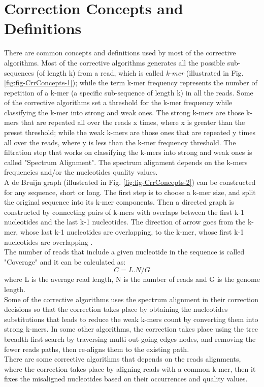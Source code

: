 \documentclass[12pt]{llncs}
\begin{document}
\section{Correction Concepts and Definitions}
There are common concepts and definitions used by most of the corrective algorithms. Most of the corrective algorithms generates all the possible sub-sequences (of length k) from a read, which is called \textit{k-mer} (illustrated in Fig. \ref{fig:fig-CrrConcepts-1}); while the term k-mer frequency represents the number of repetition of a k-mer (a specific sub-sequence of length k) in all the reads. Some of the corrective algorithms set a threshold for the k-mer frequency while classifying the k-mer into strong and weak ones. The strong k-mers are those k-mers that are repeated all over the reads x times, where x is greater than the preset threshold; while the weak k-mers are those ones that are repeated y times all over the reads, where y is less than the k-mer frequency threshold. The filtration step that works on classifying the k-mers into strong and weak ones is called "Spectrum Alignment". The spectrum alignment depends on the k-mers frequencies and/or the nucleotides quality values.
\\
A de Bruijn graph (illustrated in Fig. \ref{fig:fig-CrrConcepts-2}) can be constructed for any sequence, short or long. The first step is to choose a k-mer size, and split the original sequence into its k-mer components. Then a directed graph is constructed by connecting pairs of k-mers with overlaps between the first k-1 nucleotides and the last k-1 nucleotides. The direction of arrow goes from the k-mer, whose last k-1 nucleotides are overlapping, to the k-mer, whose first k-1 nucleotides are overlapping \cite{deBruijn}.
\\ 
The number of reads that include a given nucleotide in the sequence is called "Coverage" and it can be calculated as:
\[ C = L.N/G \]
where L is the average read length, N is the number of reads and G is the genome length.
\\
Some of the corrective algorithms uses the spectrum alignment in their correction decisions so that the correction takes place by obtaining the nucleotides substitutions that leads to reduce the weak k-mers count by converting them into strong k-mers.
In some other algorithms, the correction takes place using the tree breadth-first search by traversing multi out-going edges nodes, and removing the fewer reads paths, then re-aligns them to the existing path.
\\
There are some corrective algorithms that depends on the reads alignments, where the correction takes place by aligning reads with a common k-mer, then it fixes the misaligned nucleotides based on their occurrences and quality values.
\end{document}
